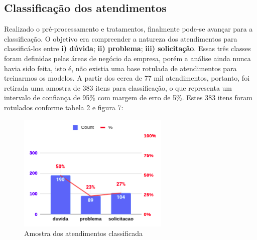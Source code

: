 \documentclass[twocolumn]{rbef}
\newcommand{\1}{\mathbbm{1}}
\begin{document}
\subsection{Classificação dos atendimentos} \label{Sessao4.3}
Realizado o pré-processamento e tratamentos, finalmente pode-se avançar para a classificação. O objetivo era compreender a natureza dos atendimentos para classificá-los entre \textbf{i) dúvida}; \textbf{ii) problema}; \textbf{iii) solicitação}. Essas três classes foram definidas pelas áreas de negócio da empresa, porém a análise ainda nunca havia sido feita, isto é, não existia uma base rotulada de atendimentos para treinarmos os modelos. A partir dos cerca de 77 mil atendimentos, portanto, foi retirada uma amostra de 383 itens para classificação, o que representa um intervalo de confiança de 95\% com margem de erro de 5\%. Estes 383 itens foram rotulados conforme tabela 2 e figura 7:
\begin{table}[!htb]
\caption{Amostra dos atendimentos}
\end{table}
\begin{figure}[!htb]
  \centering \includegraphics[scale=0.7]{7. Amostra classificada atendimentos.png}
  \caption{Amostra dos atendimentos classificada}
  \label{fig7}
\end{figure}
\end{document}
